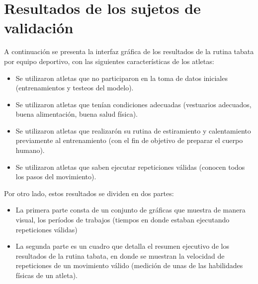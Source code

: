 \section{Resultados de los sujetos de validaci\'on} \label{res:valResults}
A continuaci\'on se presenta la interfaz gr\'afica de los resultados de la rutina tabata por equipo deportivo, con las siguientes caracter\'isticas de los atletas:
\begin{itemize}
\item Se utilizaron atletas que no participaron en la toma de datos iniciales (entrenamientos y testeos del modelo).
\item Se utilizaron atletas que ten\'ian  condiciones adecuadas (vestuarios adecuados, buena alimentaci\'on,  buena salud f\'isica).
\item Se utilizaron atletas que realizar\'on su rutina de estiramiento y calentamiento previamente al entrenamiento (con el fin de objetivo de preparar el cuerpo humano).
\item Se utilizaron atletas que saben ejecutar repeticiones v\'alidas (conocen todos los pasos del movimiento). 
\end{itemize}
\medbreak
Por otro lado, estos resultados se dividen en dos partes:
\begin{itemize}
\item La primera parte consta de un conjunto de gr\'aficas que muestra de manera visual, los per\'iodos de trabajos (tiempos en donde estaban ejecutando repeticiones v\'alidas)
\item La segunda parte es un cuadro que detalla el  resumen ejecutivo de los resultados de la rutina tabata, en donde se muestran la velocidad de repeticiones de un movimiento v\'alido (medici\'on de unas de las habilidades f\'isicas de un atleta).
\end{itemize}
